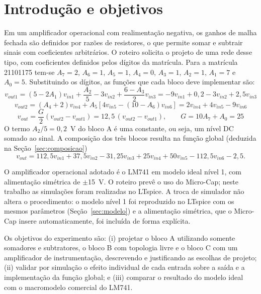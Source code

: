 \section{Introdução e objetivos}
\label{sec:objetivos}

Em um amplificador operacional com realimentação negativa, os ganhos
de malha fechada são definidos por razões de resistores, o que permite
somar e subtrair sinais com coeficientes
arbitrários. O roteiro solicita o projeto de uma rede
desse tipo, com coeficientes definidos pelos dígitos da matrícula.
Para a matrícula 21101175 tem-se $A_7{=}2$, $A_6{=}1$, $A_5{=}1$,
$A_4{=}0$, $A_3{=}1$, $A_2{=}1$, $A_1{=}7$ e $A_0{=}5$. Substituindo
os dígitos, as funções que cada bloco deve implementar são:
%
\[ v_{out1} = (5-2A_1)v_{in1} + \frac{A_2}{5} - 3v_{in2} + \frac{6-A_3}{2}v_{in3}
            = -9v_{in1} + 0{,}2 - 3v_{in2} + 2{,}5v_{in3} \]
\[ v_{out2} = (A_4+2)v_{in4} + A_5[4v_{in5} - (10-A_6)v_{in6}]
            = 2v_{in4} + 4v_{in5} - 9v_{in6} \]
\[ v_{out} = \frac{G}{2}(v_{out2}-v_{out1}) = 12{,}5\,(v_{out2}-v_{out1}),
   \qquad G = 10A_7+A_0 = 25 \]
%
O termo $A_2/5 = 0{,}2$~V do bloco A é uma constante, ou seja, um
nível DC somado ao sinal. A composição dos três blocos resulta na
função global (deduzida na Seção~\ref{sec:composicao})
%
\[ v_{out} = 112{,}5v_{in1} + 37{,}5v_{in2} - 31{,}25v_{in3}
           + 25v_{in4} + 50v_{in5} - 112{,}5v_{in6} - 2{,}5. \]

O amplificador operacional adotado é o LM741 em modelo ideal nível 1,
com alimentação simétrica de $\pm$\SI{15}{\volt}. O roteiro prevê o
uso do Micro-Cap; neste trabalho as simulações foram realizadas no
LTspice. A troca de simulador não altera o procedimento: o modelo
nível 1 foi reproduzido no LTspice com os mesmos parâmetros
(Seção~\ref{sec:modelo}) e a alimentação simétrica, que o Micro-Cap
insere automaticamente, foi incluída de forma explícita.

Os objetivos do experimento são: (i) projetar o bloco A utilizando
somente somadores e subtratores, o bloco B com topologia livre e o
bloco C com um amplificador de instrumentação, descrevendo e
justificando as escolhas de projeto; (ii) validar por simulação o
efeito individual de cada entrada sobre a saída e a implementação da
função global; e (iii) comparar o resultado do modelo ideal com o
macromodelo comercial do LM741.
